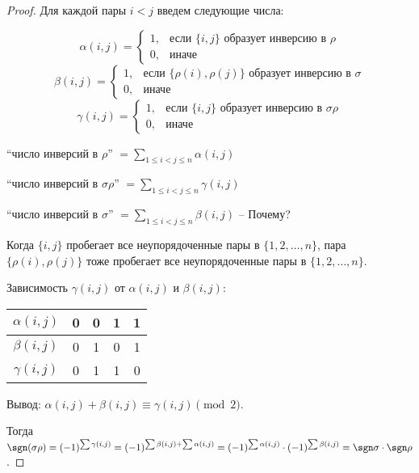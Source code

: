 \begin{proof}
    Для каждой пары $i < j$ введем следующие числа:

    \begin{equation*}
        \alpha(i,j) = \begin{cases}
            1, &\text{если } \{i, j\} \text{ образует инверсию в } \rho \\
            0, &\text{иначе}
        \end{cases}
    \end{equation*}
    \begin{equation*}
        \beta(i,j) = \begin{cases}
            1, &\text{если }  \{\rho(i), \rho(j)\} \text{ образует инверсию в } \sigma \\
            0, &\text{иначе}
        \end{cases}
    \end{equation*}
    \begin{equation*}
        \gamma(i,j) = \begin{cases}
            1, &\text{если }  \{i, j\} \text{ образует инверсию в } \sigma \rho \\
            0, &\text{иначе}
        \end{cases}
    \end{equation*}

    \everymath{\displaystyle}

    ``число инверсий в $\rho$'' $= \sum_{1 \leq i < j \leq n} \alpha(i, j) $

    ``число инверсий в $\sigma \rho$'' $= \sum_{1 \leq i < j \leq n} \gamma(i, j) $

    ``число инверсий в $\sigma$'' $= \sum_{1 \leq i < j \leq n} \beta(i, j)$ -- Почему?

    Когда $\{i, j\}$ пробегает все неупорядоченные пары в $\{1, 2, \dots, n\}$, пара $\{\rho(i), \rho(j)\}$ тоже пробегает все неупорядоченные пары в $\{1, 2, \dots, n\}$.

    \bigskip
    Зависимость $\gamma(i,j)$ от $\alpha(i,j)$ и $\beta(i,j)$:
    \begin{table}[!ht]
        \begin{center}
            \begin{tabular}{c|c|c|c|c}
                $\alpha(i,j)$ & 0 & 0 & 1 & 1 \\
                \hline
                $\beta(i,j)$ & 0 & 1 & 0 & 1 \\
                \hline
                $\gamma(i,j)$ & 0 & 1 & 1 & 0 \\
            \end{tabular}
        \end{center}
    \end{table}

    Вывод: $ \alpha(i, j) + \beta(i, j) \equiv \gamma(i,j) \pmod{2}$.

    \bigskip
    Тогда $\sgn(\sigma \rho) = (-1)^{\sum \gamma(i,j)} = (-1)^{\sum \beta(i,j) + \sum \alpha(i,j)} = (-1)^{\sum \alpha(i,j)} \cdot (-1)^{\sum \beta(i,j)} = \sgn \sigma \cdot \sgn \rho$.
\end{proof}

